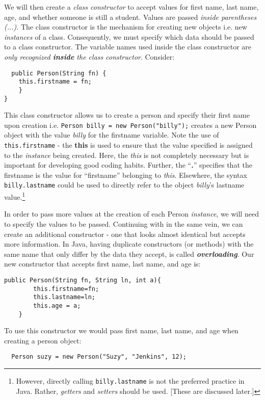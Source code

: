 \documentclass{article}
\begin{document}
\begin{flushleft}
We will then create a \emph{class constructor} to accept values for first name, last name, age, and whether someone is still a student. Values are passed \emph{inside parentheses (...)}. The class constructor is the mechanism for creating new objects i.e. new \emph{instances} of a class. Consequently, we must specify which data should be passed to a class constructor. The variable names used inside the class constructor are \emph{only recognized \textbf{inside} the class constructor}. Consider:
\begin{verbatim}
  public Person(String fn) {
    this.firstname = fn;
    }
}
\end{verbatim}
This class constructor allows us to create a person and specify their first name upon creation i.e. \texttt{Person billy = new Person("billy");} creates a new Person object with the value \emph{billy} for the firstname variable. Note the use of \texttt{this.firstname} - the \textbf{this} is used to ensure that the value specified is assigned to the \emph{instance} being created. Here, the \emph{this} is not completely necessary but is important for developing good coding habits. Further, the ``\textbf{.}'' specifies that the firstname is the value for ``firstname'' belonging to \emph{this}. Elsewhere, the syntax \texttt{billy.lastname} could be used to directly refer to the object \emph{billy}'s lastname value.\footnote{However, directly calling \texttt{billy.lastname} is not the preferred practice in Java. Rather, \emph{getters} and \emph{setters} should be used. [These are discussed later.]}\par
In order to pass more values at the creation of each Person \emph{instance}, we will need to specify the values to be passed. Continuing with in the same vein, we can create an additional constructor - one that looks almost identical but accepts more information. In Java, having duplicate constructors (or methods) with the same name that only differ by the data they accept, is called \emph{\textbf{overloading}}. Our new constructor that accepts first name, last name, and age is:
\begin{verbatim}
public Person(String fn, String ln, int a){
        this.firstname=fn; 
        this.lastname=ln;
        this.age = a; 
    }
\end{verbatim}

To use this constructor we would pass first name, last name, and age when creating a person object:\\
\begin{verbatim}
  Person suzy = new Person("Suzy", "Jenkins", 12);
\end{verbatim}



\end{flushleft}
\end{document}
